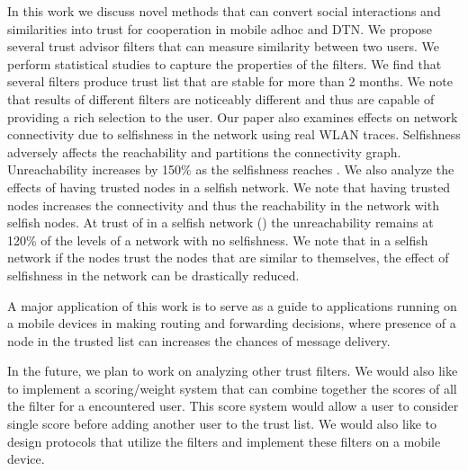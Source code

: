 \documentclass[10pt,conference]{IEEEtran}
\begin{document}
In this work we discuss novel methods that can convert social interactions and similarities into trust for cooperation in mobile adhoc and DTN. We propose several trust advisor filters that can measure similarity between two users. We perform statistical studies to capture the properties of the filters. We find that several filters produce trust list that are stable for more than 2 months. We note that results of different filters are noticeably different  and  thus are capable of providing a rich selection to the user.  Our paper  also examines effects on network connectivity due to selfishness in the network using real WLAN traces. Selfishness adversely affects the reachability and partitions the connectivity graph. Unreachability increases by 150\% as the selfishness reaches . We also analyze the effects of having trusted nodes in a selfish network. We note that having trusted nodes increases the connectivity and thus the reachability in the network with selfish nodes. At trust of  in a selfish network () the unreachability remains at 120\% of the levels of a network with no selfishness. We note that in a selfish network if the nodes trust the nodes that are similar to themselves, the effect of selfishness in the network can be drastically reduced. 

A major application of this work is to serve as a guide to applications running on  a mobile devices in making routing and forwarding decisions, where  presence of a node in the trusted list can increases the chances of message delivery.


In the future, we plan to work on analyzing other trust filters. We would also like to implement a scoring/weight system that can combine together the scores of all the filter for a encountered user. This score system would allow a user to consider single score before adding another user to the trust list. We would also like to design protocols that utilize the filters and implement these filters on a mobile device.








	
\end{document}
